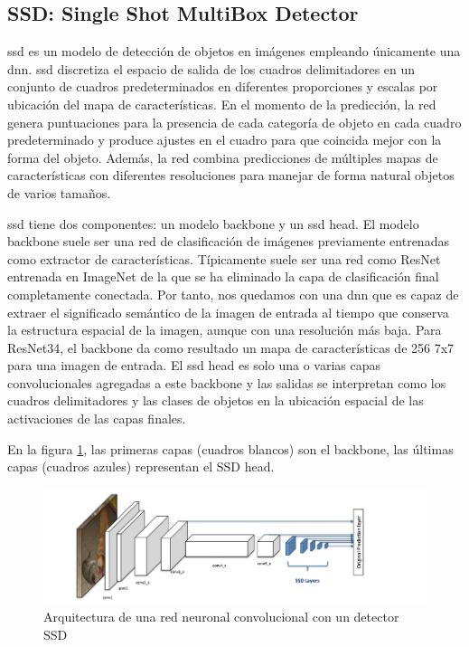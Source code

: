 \subsection{SSD: Single Shot MultiBox Detector}
\label{subsec:ssd}

\gls{ssd} \cite{Liu_2016} es un modelo de detección de objetos en imágenes empleando únicamente una \gls{dnn}. \gls{ssd} discretiza el espacio de salida de los cuadros delimitadores en un conjunto de cuadros predeterminados en diferentes proporciones y escalas por ubicación del mapa de características. En el momento de la predicción, la red genera puntuaciones para la presencia de cada categoría de objeto en cada cuadro predeterminado y produce ajustes en el cuadro para que coincida mejor con la forma del objeto. Además, la red combina predicciones de múltiples mapas de características con diferentes resoluciones para manejar de forma natural objetos de varios tamaños.

\gls{ssd} tiene dos componentes: un modelo backbone y un \gls{ssd} head. El modelo backbone suele ser una red de clasificación de imágenes previamente entrenadas como extractor de características. Típicamente suele ser una red como ResNet entrenada en ImageNet \cite{russakovsky2015imagenet} de la que se ha eliminado la capa de clasificación final completamente conectada. Por tanto, nos quedamos con una \gls{dnn} que es capaz de extraer el significado semántico de la imagen de entrada al tiempo que conserva la estructura espacial de la imagen, aunque con una resolución más baja. Para ResNet34, el backbone da como resultado un mapa de características de 256 7x7 para una imagen de entrada. El \gls{ssd} head es solo una o varias capas convolucionales agregadas a este backbone y las salidas se interpretan como los cuadros delimitadores y las clases de objetos en la ubicación espacial de las activaciones de las capas finales.

En la figura \ref{fig:ssd-structure}, las primeras capas (cuadros blancos) son el backbone, las últimas capas (cuadros azules) representan el SSD head.

\begin{figure}[ht]
\centering
\includegraphics[width=1\textwidth]{img/chapters/estado-del-arte/ssd-structure.png}
\caption{\label{fig:ssd-structure}Arquitectura de una red neuronal convolucional con un detector SSD \cite{how-works-ssd}}
\end{figure}

